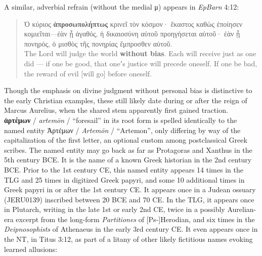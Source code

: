 \noindent{}A similar, adverbial refrain (without the medial μ) appears in \textit{EpBarn} 4:12: %

\vspace*{3mm} 
 \begin{quote}Ὁ κύριος \textbf{ἀπροσωπολήπτως} κρινεῖ τὸν κόσμον· %
 ἕκαστος καθὼς ἐποίησεν κομιεῖται—ἐὰν ᾖ ἀγαθός, %
 ἡ δικαιοσύνη αὐτοῦ προηγήσεται αὐτοῦ· %
 ἐὰν ᾖ πονηρός, ὁ μισθὸς τῆς πονηρίας ἔμπροσθεν αὐτοῦ. \\[1mm] %
 The Lord will judge the world \textbf{without bias}. %
 Each will receive just as one did --- if one be good, %
 that oneʼs justice will precede oneself. %
 If one be bad, the reward of evil [will go] before oneself. \end{quote} %
 \vspace*{3mm}

Though the emphasis on divine judgment without personal bias %
is distinctive to the early Christian examples, %
these still likely date during or after the reign of Marcus Aurelius, %
when the shared stem apparently first gained traction. \\[2mm] %

\noindent{}\textbf{ἀρτέμων} / \textit{artemōn} / “foresail” in its root form is spelled identically %
to the named entity Ἀρτέμων / \textit{Artemōn} / “Artemon”, %
only differing by way of the capitalization of the first letter, %
an optional custom among postclassical Greek scribes. %
The named entity may go back as far as Protagoras and Xanthus in the 5th century BCE. %
It is the name of a known Greek historian in the 2nd century BCE. %
Prior to the 1st century CE, this named entity appears 14 times in the TLG and 25 times in digitized Greek papyri, %
and some 10 additional times in Greek papyri in or after the 1st century CE. %
It appears once in a Judean ossuary (JERU0139) inscribed between 20 BCE and 70 CE. %
In the TLG, it appears once in Plutarch, writing in the late 1st or early 2nd CE, %
twice in a possibly Aurelian-era excerpt from the long-form \textit{Partitiones} of [Ps-]Herodian, %
and six times in the \textit{Deipnosophists} of Athenaeus in the early 3rd century CE. %
It even appears once in the NT, in Titus 3:12, %
as part of a litany of other likely fictitious names evoking learned allusions: %

